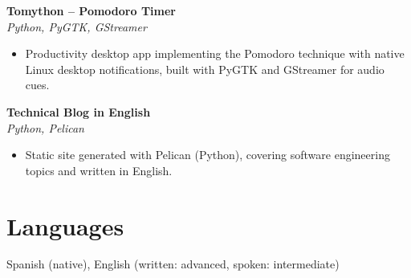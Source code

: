 \documentclass[11pt,a4paper]{article}
\newcommand{\proj}[2]{%
    \textbf{#1} \\
    \textit{#2}\\[2pt]
}
\begin{document}
\proj{Tomython -- Pomodoro Timer}{Python, PyGTK, GStreamer}
\begin{itemize}[leftmargin=*, itemsep=1pt, topsep=2pt]
    \item Productivity desktop app implementing the Pomodoro technique with native Linux desktop notifications, built with PyGTK and GStreamer for audio cues.
\end{itemize}

\proj{Technical Blog in English}{Python, Pelican}
\begin{itemize}[leftmargin=*, itemsep=1pt, topsep=2pt]
    \item Static site generated with Pelican (Python), covering software engineering topics and written in English.
\end{itemize}

\section*{Languages}
Spanish (native), English (written: advanced, spoken: intermediate)
\end{document}
